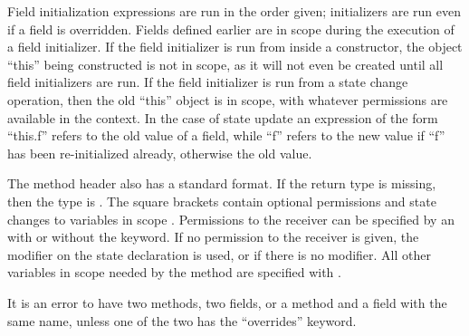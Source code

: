 Field initialization expressions are run in the order given;
initializers are run even if a field is overridden.  Fields defined
earlier are in scope during the execution of a field initializer.
If the field initializer is run from inside a constructor, the
object ``this'' being constructed is not in scope, as it will not
even be created until all field initializers are run.  If the field
initializer is run from a state change operation, then the old ``this''
object is in scope, with whatever permissions are available in the
context.  In the case of state update an expression of the form ``this.f''
refers to the old value of a field, while ``f'' refers to the new value
if ``f'' has been re-initialized already, otherwise the old value.



The method header  also has a standard format. If the return type is missing, then the type is . The square brackets contain optional permissions and state changes to variables in scope . Permissions to the receiver can be specified by an  with or without the  keyword. If no permission to the receiver is given, the  modifier on the state declaration is used, or  if there is no  modifier. All other variables in scope needed by the method are specified  with .



It is an error to have two methods, two fields, or a method and a
field with the same name, unless one of the two has the ``overrides''
keyword.

\begin{quote}




 {}






\end{quote}

